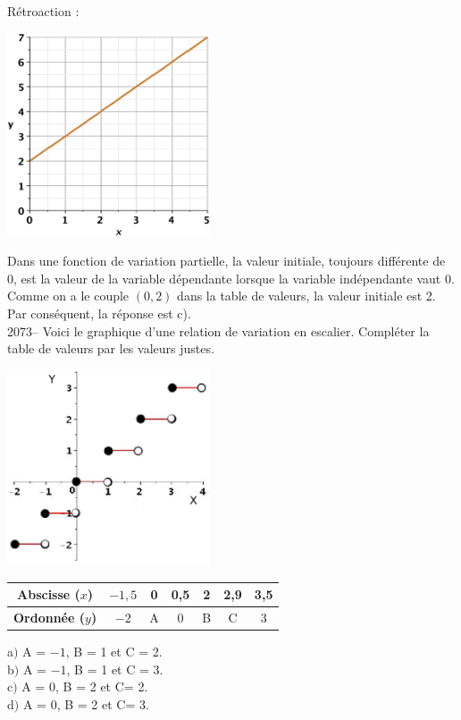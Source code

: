 \documentclass[letterpaper, 12pt]{article}
\begin{document}
R\'etroaction :\\
\begin{center}
 \includegraphics[width=6cm]{Q2072.eps}
\end{center}
Dans une fonction de variation partielle, la valeur initiale, toujours diff\'erente de 0, est la valeur de la variable d\'ependante lorsque la variable ind\'ependante vaut 0. Comme on a le couple $(0,2)$ dans la table de valeurs, la valeur initiale est 2.\\
Par cons\'equent, la r\'eponse est c).\\

2073-- Voici le graphique d'une relation de variation en escalier. Compl\'eter la table de valeurs par les valeurs justes.
\begin{center}
 \includegraphics[width=6cm]{Q2073.eps}
\end{center}
\begin{center}
 \begin{tabular}{|c||c| c | c | c | c | c |} \hline
{\bf Abscisse ($x$)} & $-1,5$ & 0 & 0,5 & 2 & 2,9 & 3,5 \\ \hline \hline
{\bf Ordonn\'ee ($y$)} & $-2$ & A & 0 & B & C & 3 \\ \hline
\end{tabular}
\end{center}
a$)$ A = $-1$, B = 1 et C = 2.\\
b$)$ A = $-1$, B = 1 et C = 3.\\
c$)$ A = 0, B = 2 et C= 2.\\
d$)$ A = 0, B = 2 et C= 3.\\
\end{document}
